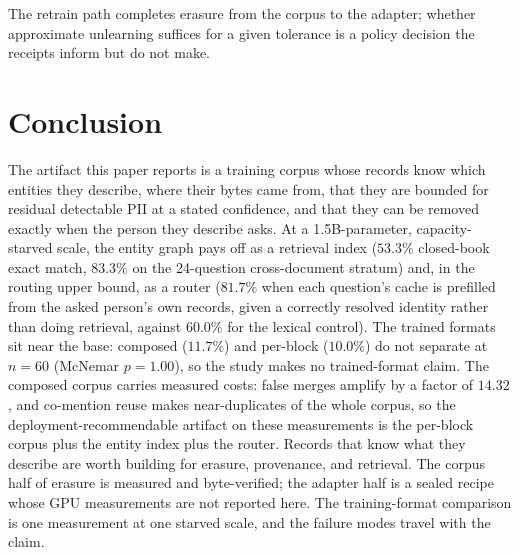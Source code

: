 \documentclass{article}
\begin{document}
The retrain path completes erasure from the corpus to the adapter; whether approximate unlearning suffices for a given tolerance is a policy decision the receipts inform but do not make.

\section{Conclusion}
\label{sec:conclusion}

The artifact this paper reports is a training corpus whose records know which entities they describe, where their bytes came from, that they are bounded for residual detectable PII at a stated confidence, and that they can be removed exactly when the person they describe asks. At a 1.5B-parameter, capacity-starved scale, the entity graph pays off as a retrieval index ($53.3\%$ closed-book exact match, $83.3\%$ on the 24-question cross-document stratum) and, in the routing upper bound, as a router ($81.7\%$ when each question's cache is prefilled from the asked person's own records, given a correctly resolved identity rather than doing retrieval, against $60.0\%$ for the lexical control). The trained formats sit near the base: composed ($11.7\%$) and per-block ($10.0\%$) do not separate at $n{=}60$ (McNemar $p{=}1.00$), so the study makes no trained-format claim. The composed corpus carries measured costs: false merges amplify by a factor of $14.32$, and co-mention reuse makes near-duplicates of the whole corpus, so the deployment-recommendable artifact on these measurements is the per-block corpus plus the entity index plus the router. Records that know what they describe are worth building for erasure, provenance, and retrieval. The corpus half of erasure is measured and byte-verified; the adapter half is a sealed recipe whose GPU measurements are not reported here. The training-format comparison is one measurement at one starved scale, and the failure modes travel with the claim.



\end{document}
